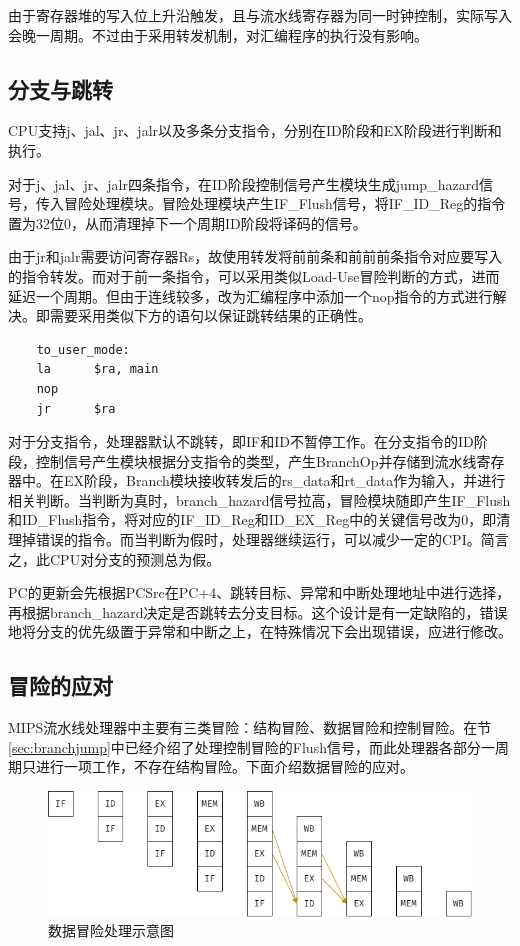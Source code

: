 \documentclass[a4paper]{article}
\begin{document}
由于寄存器堆的写入位上升沿触发，且与流水线寄存器为同一时钟控制，实际写入会晚一周期。不过由于采用转发机制，对汇编程序的执行没有影响。

\subsection{分支与跳转\label{sec:branchjump}}

CPU支持j、jal、jr、jalr以及多条分支指令，分别在ID阶段和EX阶段进行判断和执行。

对于j、jal、jr、jalr四条指令，在ID阶段控制信号产生模块生成jump\_hazard信号，传入冒险处理模块。冒险处理模块产生IF\_Flush信号，将IF\_ID\_Reg的指令置为32位0，从而清理掉下一个周期ID阶段将译码的信号。

由于jr和jalr需要访问寄存器Rs，故使用转发将前前条和前前前条指令对应要写入的指令转发。而对于前一条指令，可以采用类似Load-Use冒险判断的方式，进而延迟一个周期。但由于连线较多，改为汇编程序中添加一个nop指令的方式进行解决。即需要采用类似下方的语句以保证跳转结果的正确性。

\begin{verbatim}
    to_user_mode:
    la      $ra, main
    nop
    jr      $ra
\end{verbatim}

对于分支指令，处理器默认不跳转，即IF和ID不暂停工作。在分支指令的ID阶段，控制信号产生模块根据分支指令的类型，产生BranchOp并存储到流水线寄存器中。在EX阶段，Branch模块接收转发后的rs\_data和rt\_data作为输入，并进行相关判断。当判断为真时，branch\_hazard信号拉高，冒险模块随即产生IF\_Flush和ID\_Flush指令，将对应的IF\_ID\_Reg和ID\_EX\_Reg中的关键信号改为0，即清理掉错误的指令。而当判断为假时，处理器继续运行，可以减少一定的CPI。简言之，此CPU对分支的预测总为假。

PC的更新会先根据PCSrc在PC+4、跳转目标、异常和中断处理地址中进行选择，再根据branch\_hazard决定是否跳转去分支目标。这个设计是有一定缺陷的，错误地将分支的优先级置于异常和中断之上，在特殊情况下会出现错误，应进行修改。

\subsection{冒险的应对\label{sec:hazard}}

MIPS流水线处理器中主要有三类冒险：结构冒险、数据冒险和控制冒险。在节\ref{sec:branchjump}中已经介绍了处理控制冒险的Flush信号，而此处理器各部分一周期只进行一项工作，不存在结构冒险。下面介绍数据冒险的应对。

\begin{figure}[htb]
    \centering
    \includegraphics[width=.8\textwidth]{../assets/hazard.png}
    \caption{数据冒险处理示意图}
    \label{fig:hazard}
\end{figure}
\end{document}
